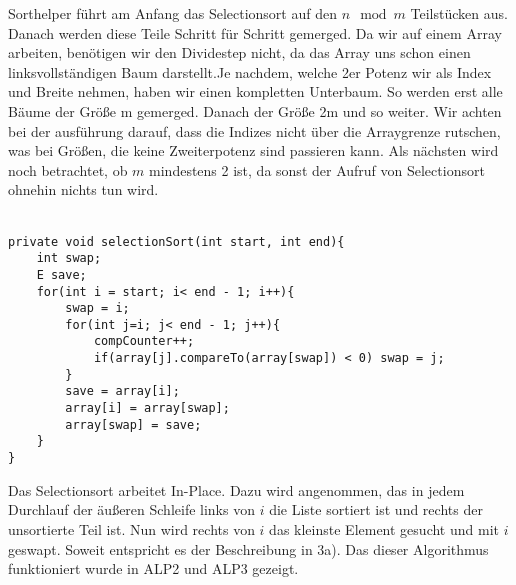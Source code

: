 \documentclass[11pt,a4paper,ngerman]{article}
\begin{document}
Sorthelper führt am Anfang das Selectionsort auf den $n \mod m$ Teilstücken aus. Danach werden diese Teile Schritt für Schritt gemerged. Da wir auf einem Array arbeiten, benötigen wir den Dividestep nicht, da das Array uns schon einen linksvollständigen Baum darstellt.Je nachdem, welche 2er Potenz wir als Index und Breite nehmen, haben wir einen kompletten Unterbaum. So werden erst alle Bäume der Größe m gemerged. Danach der Größe 2m und so weiter. Wir achten bei der ausführung darauf, dass die Indizes nicht über die Arraygrenze rutschen, was bei Größen, die keine Zweiterpotenz sind passieren kann. Als nächsten wird noch betrachtet, ob $m$ mindestens 2 ist, da sonst der Aufruf von Selectionsort ohnehin nichts tun wird.\\
\vspace{\baselineskip}\\

\begin{lstlisting}
private void selectionSort(int start, int end){
	int swap;
	E save;
	for(int i = start; i< end - 1; i++){
		swap = i;
		for(int j=i; j< end - 1; j++){
			compCounter++;
			if(array[j].compareTo(array[swap]) < 0) swap = j;
		}
		save = array[i];
		array[i] = array[swap];
		array[swap] = save;
	}
}
\end{lstlisting}
Das Selectionsort arbeitet In-Place. Dazu wird angenommen, das in jedem Durchlauf der äußeren Schleife links von $i$ die Liste sortiert ist und rechts der unsortierte Teil ist. Nun wird rechts von $i$ das kleinste Element gesucht und mit $i$ geswapt. Soweit entspricht es der Beschreibung in 3a). Das dieser Algorithmus funktioniert wurde in ALP2 und ALP3 gezeigt.\\
\end{document}
